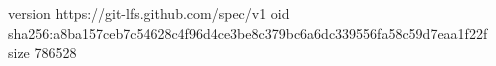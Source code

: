 version https://git-lfs.github.com/spec/v1
oid sha256:a8ba157ceb7c54628c4f96d4ce3be8c379bc6a6dc339556fa58c59d7eaa1f22f
size 786528
